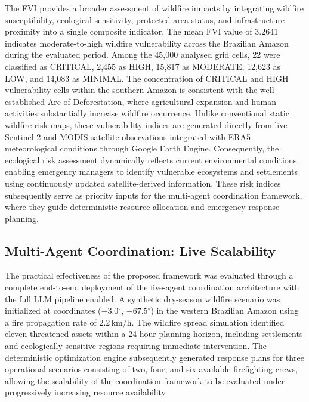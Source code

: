 \documentclass{ieeeaccess}
\begin{document}
The FVI provides a broader assessment of wildfire impacts by integrating wildfire susceptibility, ecological sensitivity, protected-area status, and infrastructure proximity into a single composite indicator. The mean FVI value of 3.2641 indicates moderate-to-high wildfire vulnerability across the Brazilian Amazon during the evaluated period. Among the 45,000 analysed grid cells, 22 were classified as CRITICAL, 2,455 as HIGH, 15,817 as MODERATE, 12,623 as LOW, and 14,083 as MINIMAL. The concentration of CRITICAL and HIGH vulnerability cells within the southern Amazon is consistent with the well-established Arc of Deforestation, where agricultural expansion and human activities substantially increase wildfire occurrence. Unlike conventional static wildfire risk maps, these vulnerability indices are generated directly from live Sentinel-2 and MODIS satellite observations integrated with ERA5 meteorological conditions through Google Earth Engine. Consequently, the ecological risk assessment dynamically reflects current environmental conditions, enabling emergency managers to identify vulnerable ecosystems and settlements using continuously updated satellite-derived information. These risk indices subsequently serve as priority inputs for the multi-agent coordination framework, where they guide deterministic resource allocation and emergency response planning.

\subsection{Multi-Agent Coordination: Live Scalability}
\label{sec:coord-live}

The practical effectiveness of the proposed framework was evaluated through a complete end-to-end deployment of the five-agent coordination architecture with the full LLM pipeline enabled. A synthetic dry-season wildfire scenario was initialized at coordinates ($-3.0^{\circ}$, $-67.5^{\circ}$) in the western Brazilian Amazon using a fire propagation rate of 2.2\,km/h. The wildfire spread simulation identified eleven threatened assets within a 24-hour planning horizon, including settlements and ecologically sensitive regions requiring immediate intervention. The deterministic optimization engine subsequently generated response plans for three operational scenarios consisting of two, four, and six available firefighting crews, allowing the scalability of the coordination framework to be evaluated under progressively increasing resource availability.
\end{document}
